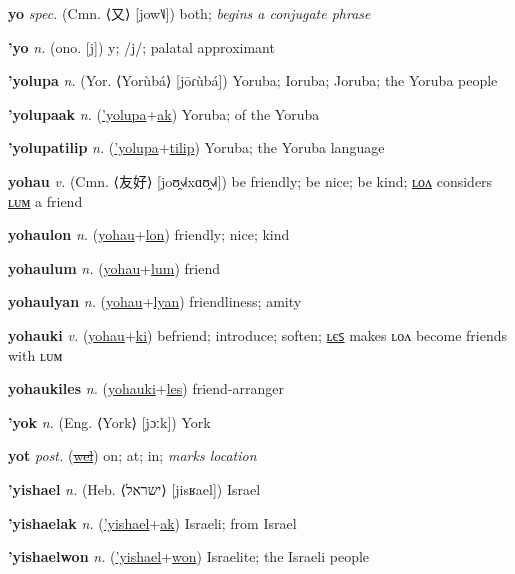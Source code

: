 \textbf{\hypertarget{yo}{yo}} \textit{spec.} (Cmn. ⟨{\chinese{}又}⟩ [jow˥˩])
both; \textit{begins a conjugate phrase}

\textbf{\hypertarget{'yo}{'yo}} \textit{n.} (ono. [j])
y; /j/; palatal approximant

\textbf{\hypertarget{'yolupa}{'yolupa}} \textit{n.} (Yor. ⟨Yorùbá⟩ [jōɾùbá])
Yoruba; Ioruba; Joruba; the Yoruba people

\textbf{\hypertarget{'yolupaak}{'yolupaak}} \textit{n.} (\hyperlink{'yolupa}{'yolupa}+\allowbreak \hyperlink{ak}{ak})
Yoruba; of the Yoruba

\textbf{\hypertarget{'yolupatilip}{'yolupatilip}} \textit{n.} (\hyperlink{'yolupa}{'yolupa}+\allowbreak \hyperlink{tilip}{tilip})
Yoruba; the Yoruba language

\textbf{\hypertarget{yohau}{yohau}} \textit{v.} (Cmn. ⟨{\chinese{}友好}⟩ [joʊ̯˧˩˧xɑʊ̯˧˩˧])
be friendly; be nice; be kind; \hyperlink{yohaulon}{ʟᴏᴧ} considers \hyperlink{yohaulum}{ʟᴜᴍ} a friend

\textbf{\hypertarget{yohaulon}{yohaulon}} \textit{n.} (\hyperlink{yohau}{yohau}+\allowbreak \hyperlink{lon}{lon})
friendly; nice; kind

\textbf{\hypertarget{yohaulum}{yohaulum}} \textit{n.} (\hyperlink{yohau}{yohau}+\allowbreak \hyperlink{lum}{lum})
friend

\textbf{\hypertarget{yohaulyan}{yohaulyan}} \textit{n.} (\hyperlink{yohau}{yohau}+\allowbreak \hyperlink{lyan}{lyan})
friendliness; amity

\textbf{\hypertarget{yohauki}{yohauki}} \textit{v.} (\hyperlink{yohau}{yohau}+\allowbreak \hyperlink{ki}{ki})
befriend; introduce; soften; \hyperlink{yohaukiles}{ʟєꜱ} makes ʟᴏᴧ become friends with ʟᴜᴍ

\textbf{\hypertarget{yohaukiles}{yohaukiles}} \textit{n.} (\hyperlink{yohauki}{yohauki}+\allowbreak \hyperlink{les}{les})
friend-arranger

\textbf{\hypertarget{'yok}{'yok}} \textit{n.} (Eng. ⟨York⟩ [jɔːk])
York

\textbf{\hypertarget{yot}{yot}} \textit{post.} (\hyperlink{wel}{\sout{wel}})
on; at; in; \textit{marks location}

\textbf{\hypertarget{'yishael}{'yishael}} \textit{n.} (Heb. ⟨{\hebrew{}ישראל}⟩ [jisʁael])
Israel

\textbf{\hypertarget{'yishaelak}{'yishaelak}} \textit{n.} (\hyperlink{'yishael}{'yishael}+\allowbreak \hyperlink{ak}{ak})
Israeli; from Israel

\textbf{\hypertarget{'yishaelwon}{'yishaelwon}} \textit{n.} (\hyperlink{'yishael}{'yishael}+\allowbreak \hyperlink{won}{won})
Israelite; the Israeli people

